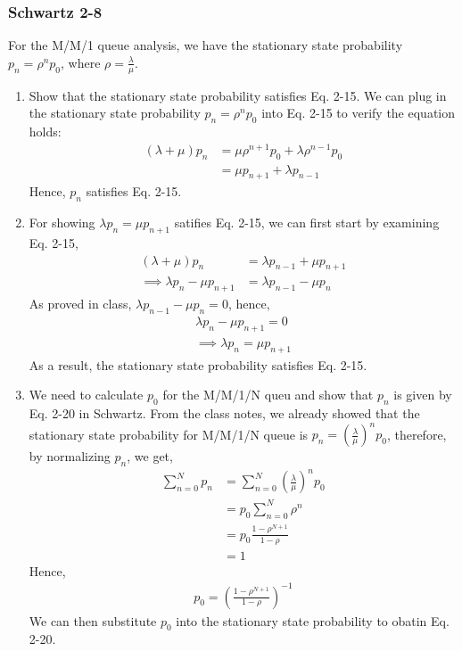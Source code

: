 \documentclass{article}
\begin{document}
		\subsubsection*{Schwartz 2-8}
			For the M/M/1 queue analysis, we have the stationary state probability $p_{n} = \rho^{n} p_{0}$,
			where $\rho = \frac{\lambda}{\mu}$.
			\begin{enumerate}
				\item Show that the stationary state probability satisfies Eq. 2-15.
					We can plug in the stationary state probability $p_{n} = \rho^{n} p_{0}$
					into Eq. 2-15 to verify the equation holds:
					\begin{align*}
						(\lambda + \mu) p_{n} &= \mu \rho^{n+1} p_{0} + \lambda \rho^{n-1} p_{0} \\
						&= \mu p_{n+1} + \lambda p_{n-1}
					\end{align*}
					Hence, $p_{n}$ satisfies Eq. 2-15.
				\item For showing $\lambda p_{n} = \mu p_{n+1}$ satifies Eq. 2-15, we
					can first start by examining Eq. 2-15,
					\begin{align*}
						(\lambda + \mu) p_{n} &= \lambda p_{n-1} + \mu p_{n+1} \\
						\implies \lambda p_{n} - \mu p_{n+1} &= \lambda p_{n-1} - \mu p_{n}
					\end{align*}
					As proved in class, $\lambda p_{n-1} - \mu p_{n} = 0$, hence,
					\begin{gather*}
						\lambda p_{n} - \mu p_{n+1} = 0 \\
						\implies \lambda p_{n} = \mu p_{n+1} 
					\end{gather*}
					As a result, the stationary state probability satisfies Eq. 2-15.
				\item We need to calculate $p_{0}$ for the M/M/1/N queu and show that $p_{n}$
					is given by Eq. 2-20 in Schwartz.
					From the class notes, we already showed that the stationary state
					probability for M/M/1/N queue is $p_{n} = (\frac{\lambda}{\mu})^n p_{0}$,
					therefore, by normalizing $p_{n}$, we get,
					\begin{align*}
						\sum_{n=0}^{N} p_{n} &= \sum_{n=0}^{N} (\frac{\lambda}{\mu})^n p_{0} \\
						&= p_{0} \sum_{n=0}^{N} \rho^{n} \\
						&= p_{0} \frac{1 - \rho^{N+1}}{1 - \rho} \\
						&= 1
					\end{align*}
					Hence,
					\begin{gather*}
						p_{0} = (\frac{1 - \rho^{N+1}}{1 - \rho})^{-1}
					\end{gather*}
					We can then substitute $p_{0}$ into the stationary state probability
					to obatin Eq. 2-20.
			\end{enumerate}
\end{document}
